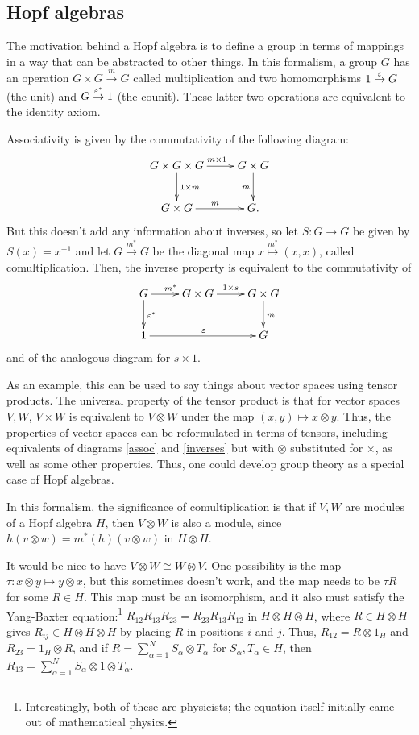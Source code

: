 \subsection{Hopf algebras}
The motivation behind a Hopf algebra is to define a group in terms of mappings in a way that can be abstracted to other things. In this formalism, a group $G$ has an operation $G\times G\stackrel{m}{\to} G$ called multiplication and two homomorphisms $1\stackrel{\varepsilon}{\to} G$ (the unit) and $G\stackrel{\varepsilon^*}{\to} 1$ (the counit). These latter two operations are equivalent to the identity axiom.

Associativity is given by the commutativity of the following diagram:
\begin{equation}
\label{assoc}
\xymatrix{
G\times G\times G \ar[r]^{\ m\times 1} \ar[d]^{1\times m} & G\times G\ar[d]_m\\
G\times G \ar[r]^m & G.
}
\end{equation}
But this doesn't add any information about inverses, so let $S:G\to G$ be given by $S(x) = x^{-1}$ and let $G\stackrel{m^*}{\to} G$ be the diagonal map $x\stackrel{m^*}{\mapsto} (x,x)$, called comultiplication. Then, the inverse property is equivalent to the commutativity of
\begin{equation}
\label{inverses}
\xymatrix{
G \ar[r]^{m^*} \ar[d]^{\e^*} & G\times G \ar[r]^{1\times s} & G\times G \ar[d]^m\\
1 \ar[rr]^{\e} & & G
}\end{equation}
and of the analogous diagram for $s\times 1$.

As an example, this can be used to say things about vector spaces using tensor products. The universal property of the tensor product is that for vector spaces $V,W$, $V\times W$ is equivalent to $V\otimes W$ under the map $(x,y)\mapsto x\otimes y$. Thus, the properties of vector spaces can be reformulated in terms of tensors, including equivalents of diagrams \ref{assoc} and \ref{inverses} but with $\otimes$ substituted for $\times$, as well as some other properties. Thus, one could develop group theory as a special case of Hopf algebras.

In this formalism, the significance of comultiplication is that if $V,W$ are modules of a Hopf algebra $H$, then $V\otimes W$ is also a module, since $h(v\otimes w) = m^*(h)(v\otimes w)$ in $H\otimes H$.

It would be nice to have $V\otimes W \cong W\otimes V$. One possibility is the map $\tau:x\otimes y\mapsto y\otimes x$, but this sometimes doesn't work, and the map needs to be $\tau R$ for some $R\in H$. This map must be an isomorphism, and it also must satisfy the Yang-Baxter equation:\footnote{Interestingly, both of these are physicists; the equation itself initially came out of mathematical physics.} $R_{12}R_{13}R_{23} = R_{23}R_{13}R_{12}$ in $H\otimes H\otimes H$, where $R\in H\otimes H$ gives $R_{ij}\in H\otimes H\otimes H$ by placing $R$ in positions $i$ and $j$. Thus, $R_{12} = R\otimes 1_H$ and $R_{23} = 1_H \otimes R$, and if $R = \sum_{\alpha = 1}^N S_\alpha \otimes T_\alpha$ for $S_\alpha,T_\alpha\in H$, then $R_{13} = \sum_{\alpha = 1}^N S_\alpha \otimes 1\otimes T_\alpha$.

